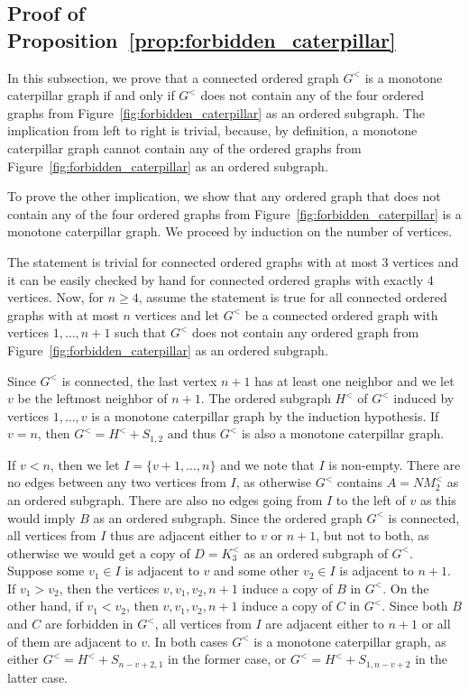 \documentclass[11pt,a4paper]{article}
\theoremstyle{remark}
\begin{document}
\subsection{Proof of Proposition~\ref{prop:forbidden_caterpillar}}

In this subsection, we prove that a connected ordered graph $G^<$ is a monotone caterpillar graph if and only if $G^<$ does not contain any of the four ordered graphs from Figure~\ref{fig:forbidden_caterpillar} as an ordered subgraph.
The implication from left to right is trivial, because, by definition, a monotone caterpillar graph cannot contain any of the ordered graphs from Figure~\ref{fig:forbidden_caterpillar} as an ordered subgraph.

To prove the other implication, we show that any ordered graph that does not contain any of the four ordered graphs from Figure~\ref{fig:forbidden_caterpillar} is a monotone caterpillar graph.
We proceed by induction on the number of vertices.

The statement is trivial for connected ordered graphs with at most 3 vertices and it can be easily checked by hand for connected ordered graphs with exactly 4 vertices.
Now, for $n \geq 4$, assume the statement is true for all connected ordered graphs with at most $n$ vertices and let $G^<$ be a connected ordered graph with vertices $1,\dots,n+1$ such that $G^<$ does not contain any ordered graph from Figure~\ref{fig:forbidden_caterpillar} as an ordered subgraph.

Since $G^<$ is connected, the last vertex $n+1$ has at least one neighbor and we let $v$ be the leftmost neighbor of $n+1$.
The ordered subgraph $H^<$ of $G^<$ induced by vertices $1,\dots,v$ is a monotone caterpillar graph by the induction hypothesis.
If $v=n$, then $G^<=H^<+S_{1,2}$ and thus $G^<$ is also a monotone caterpillar graph.

If $v<n$, then we let $I=\{v+1,\dots,n\}$ and we note that $I$ is non-empty.
There are no edges between any two vertices from $I$, as otherwise $G^<$ contains $A=NM^<_2$ as an ordered subgraph.
There are also no edges going from $I$ to the left of $v$ as this would imply $B$ as an ordered subgraph. 
Since the ordered graph $G^<$ is connected, all vertices from $I$ thus are adjacent either to $v$ or $n+1$, but not to both, as otherwise we would get a copy of $D=K_3^<$ as an ordered subgraph of $G^<$.
Suppose some $v_1\in I$ is adjacent to $v$ and some other $v_2\in I$ is adjacent to $n+1$.
If $v_1 > v_2$, then the vertices $v,v_1,v_2,n+1$ induce a copy of $B$ in $G^<$.
On the other hand, if $v_1<v_2$, then  $v,v_1,v_2,n+1$ induce a copy of $C$ in $G^<$.
Since both $B$ and $C$ are forbidden in $G^<$, all vertices from $I$ are adjacent either to $n+1$ or all of them are adjacent to $v$.
In both cases $G^<$ is a monotone caterpillar graph, as either $G^<=H^<+S_{n-v+2,1}$ in the former case, or $G^<=H^<+S_{1,n-v+2}$ in the latter case.


	

\end{document}
